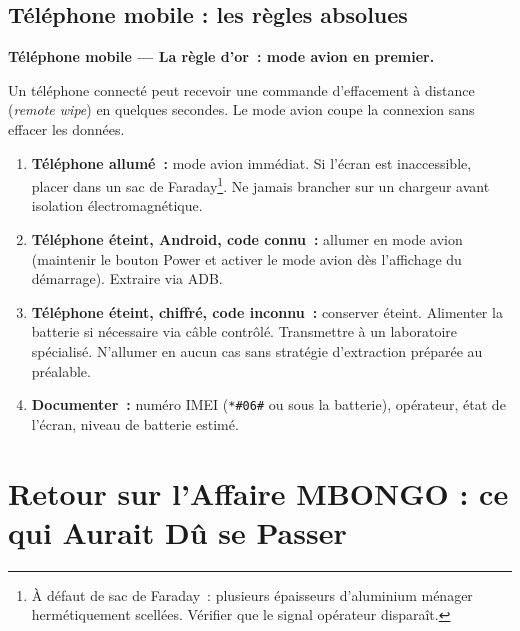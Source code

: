 \subsection{Téléphone mobile : les règles absolues}

\begin{boxPNC}
\textbf{Téléphone mobile --- La règle d'or~: mode avion en premier.}

\medskip
Un téléphone connecté peut recevoir une commande d'effacement à distance
(\textit{remote wipe}) en quelques secondes. Le mode avion coupe la
connexion sans effacer les données.

\medskip
\begin{enumerate}
    \item \textbf{Téléphone allumé~:} mode avion immédiat. Si l'écran est
          inaccessible, placer dans un sac de Faraday\footnote{À défaut de
          sac de Faraday~: plusieurs épaisseurs d'aluminium ménager
          hermétiquement scellées. Vérifier que le signal opérateur disparaît.}.
          Ne jamais brancher sur un chargeur avant isolation électromagnétique.

    \item \textbf{Téléphone éteint, Android, code connu~:} allumer en mode
          avion (maintenir le bouton Power et activer le mode avion dès
          l'affichage du démarrage). Extraire via ADB.

    \item \textbf{Téléphone éteint, chiffré, code inconnu~:} conserver
          éteint. Alimenter la batterie si nécessaire via câble contrôlé.
          Transmettre à un laboratoire spécialisé. N'allumer en aucun cas
          sans stratégie d'extraction préparée au préalable.

    \item \textbf{Documenter~:} numéro IMEI (\texttt{*\#06\#} ou sous la
          batterie), opérateur, état de l'écran, niveau de batterie estimé.
\end{enumerate}
\end{boxPNC}

\section{Retour sur l'Affaire MBONGO : ce qui Aurait Dû se Passer}
\label{sec:retour-mbongo}

